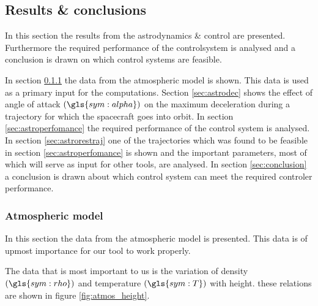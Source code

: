 \subsection{Results \& conclusions}
\label{sec:astrores}
In this section the results from the astrodynamics \& control are presented. Furthermore the required performance of the controlsystem is analysed and a conclusion is drawn on which control systems are feasible.

In section \ref{sec:astroatmos} the data from the atmospheric model is shown. This data is used as a primary input for the computations. Section \ref{sec:astrodec} shows the effect of angle of attack $\left(\gls{sym:alpha}\right)$ on the maximum deceleration during a trajectory for which the spacecraft goes into orbit. In section \ref{sec:astroperfomance} the required performance of the control system is analysed. In section \ref{sec:astrorestraj} one of the trajectories which was found to be feasible in section \ref{sec:astroperfomance} is shown and the important parameters, most of which will serve as input for other tools, are analysed. In section \ref{sec:conclusion} a conclusion is drawn about which control system can meet the required controler performance.

\subsubsection{Atmospheric model}
\label{sec:astroatmos}

In this section the data from the atmospheric model is presented. This data is of upmost importance for our tool to work properly.

The data that is most important to us is the variation of density $\left(\gls{sym:rho}\right)$ and temperature $\left(\gls{sym:T}\right)$ with height. these relations are shown in figure \ref{fig:atmos_height}.

